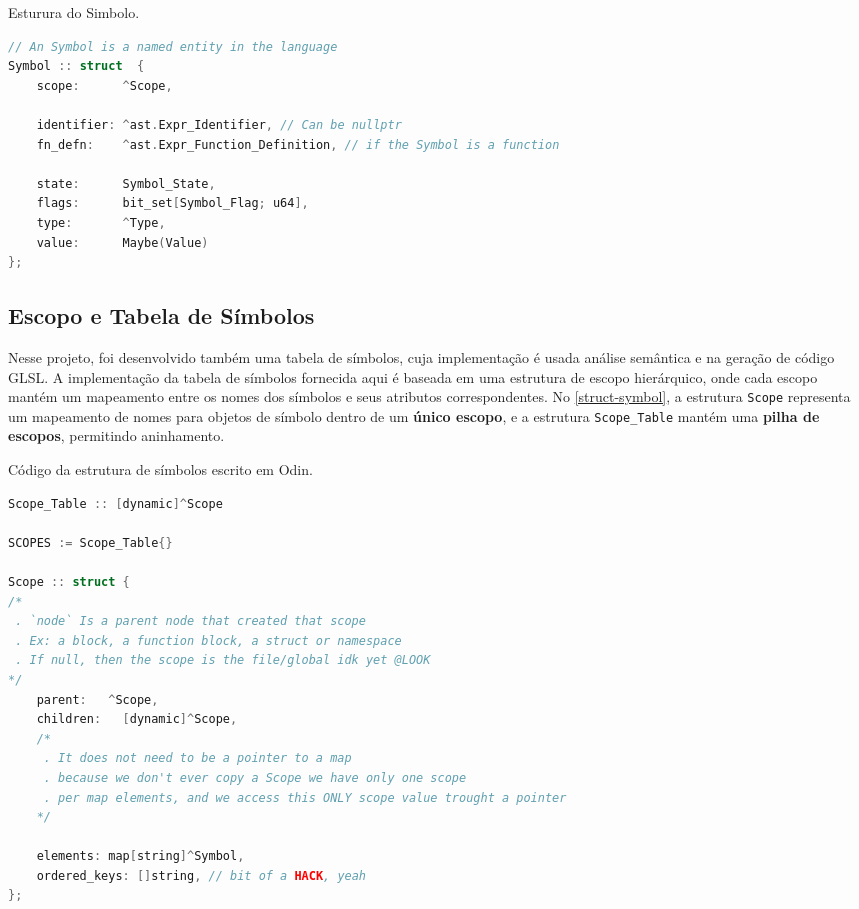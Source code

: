 \begin{codigo}[htb]
    \caption{\small Esturura do Simbolo. }
    \label{cod-symbol}
\begin{lstlisting}[language=C, numbers=none, frame=none, inputencoding=latin1]
// An Symbol is a named entity in the language
Symbol :: struct  {
    scope:      ^Scope,

    identifier: ^ast.Expr_Identifier, // Can be nullptr
    fn_defn:    ^ast.Expr_Function_Definition, // if the Symbol is a function

    state:      Symbol_State,
    flags:      bit_set[Symbol_Flag; u64],
    type:       ^Type,
    value:      Maybe(Value)
};

\end{lstlisting}
\end{codigo}


\subsection{Escopo e Tabela de Símbolos} \label{section-escope-table}

Nesse projeto, foi desenvolvido também uma tabela de símbolos, cuja implementação é usada análise semântica e na geração de código GLSL. A implementação da tabela de símbolos fornecida aqui é baseada em uma estrutura de escopo hierárquico, onde cada escopo mantém um mapeamento entre os nomes dos símbolos e seus atributos correspondentes. No \autoref{struct-symbol}, a estrutura \texttt{Scope} representa um mapeamento de nomes para objetos de símbolo dentro de um \textbf{único escopo}, e a estrutura \texttt{Scope\_Table} mantém uma \textbf{pilha de escopos}, permitindo aninhamento.

\begin{codigo}[H]
\caption{\small Código da estrutura de símbolos escrito em Odin.}
\label{struct-symbol}
\begin{lstlisting}[language=C]
Scope_Table :: [dynamic]^Scope

SCOPES := Scope_Table{}

Scope :: struct {
/*
 . `node` Is a parent node that created that scope
 . Ex: a block, a function block, a struct or namespace
 . If null, then the scope is the file/global idk yet @LOOK
*/
    parent:   ^Scope,
    children:   [dynamic]^Scope,
    /*
     . It does not need to be a pointer to a map
     . because we don't ever copy a Scope we have only one scope
     . per map elements, and we access this ONLY scope value trought a pointer
    */

    elements: map[string]^Symbol,
    ordered_keys: []string, // bit of a HACK, yeah
};

\end{lstlisting}
\end{codigo}

